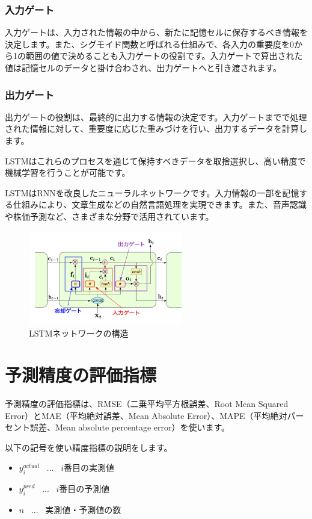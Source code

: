 \documentclass[a4paper,11pt]{jsarticle}
\begin{document}
\subsubsection{入力ゲート}
入力ゲートは、入力された情報の中から、新たに記憶セルに保存するべき情報を決定します。また、シグモイド関数と呼ばれる仕組みで、各入力の重要度を0から1の範囲の値で決めることも入力ゲートの役割です。入力ゲートで算出された値は記憶セルのデータと掛け合わされ、出力ゲートへと引き渡されます。
\subsubsection{出力ゲート}
出力ゲートの役割は、最終的に出力する情報の決定です。入力ゲートまでで処理された情報に対して、重要度に応じた重みづけを行い、出力するデータを計算します。

LSTMはこれらのプロセスを通じて保持すべきデータを取捨選択し、高い精度で機械学習を行うことが可能です。

LSTMはRNNを改良したニューラルネットワークです。入力情報の一部を記憶する仕組みにより、文章生成などの自然言語処理を実現できます。また、音声認識や株価予測など、さまざまな分野で活用されています。

\begin{figure}[H]  
  \centering  
  \includegraphics[width=0.6\textwidth]{pic/lstm1.png}  
  \caption{LSTMネットワークの構造}  
  \label{fig:lstm1}  
\end{figure}  
\vspace{1em}

\section{予測精度の評価指標}
予測精度の評価指標は、RMSE（二乗平均平方根誤差、Root Mean Squared Error）とMAE（平均絶対誤差、Mean Absolute Error）、MAPE（平均絶対パーセント誤差、Mean absolute percentage error）を使います。  

以下の記号を使い精度指標の説明をします。  

\begin{itemize}  
\item $y_i^{actual}$ \, ... \, $i$番目の実測値  
\item $y_i^{pred}$ \, ... \, $i$番目の予測値  
\item $n$ \, ... \, 実測値・予測値の数  
\end{itemize}  
\end{document}

